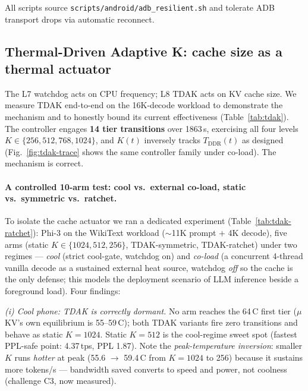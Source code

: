 \documentclass[sigconf, anonymous=false, screen=true]{acmart}
\begin{document}
All scripts source \texttt{scripts/android/adb\_resilient.sh} and tolerate ADB transport drops via automatic reconnect.




\subsection{Thermal-Driven Adaptive K: cache size as a thermal actuator}
\label{sec:eval-tdak}

The L7 watchdog acts on CPU frequency; L8 TDAK acts on KV cache size. We measure TDAK end-to-end on the 16K-decode workload to demonstrate the mechanism and to honestly bound its current effectiveness (Table~\ref{tab:tdak}). The controller engages \textbf{14 tier transitions} over 1863\,s, exercising all four levels $K\in\{256, 512, 768, 1024\}$, and $K(t)$ inversely tracks $T_{\text{DDR}}(t)$ as designed (Fig.~\ref{fig:tdak-trace} shows the same controller family under co-load). The mechanism is correct.

\paragraph{A controlled 10-arm test: cool vs.\ external co-load, static vs.\ symmetric vs.\ ratchet.} To isolate the cache actuator we ran a dedicated experiment (Table~\ref{tab:tdak-ratchet}): Phi-3 on the WikiText workload ($\sim$11K prompt $+$ 4K decode), five arms (static $K\in\{1024,512,256\}$, TDAK-symmetric, TDAK-ratchet) under two regimes --- \emph{cool} (strict cool-gate, watchdog on) and \emph{co-load} (a concurrent 4-thread vanilla decode as a sustained external heat source, watchdog \emph{off} so the cache is the only defense; this models the deployment scenario of LLM inference beside a foreground load). Four findings:

\emph{(i) Cool phone: TDAK is correctly dormant.} No arm reaches the 64\,\textdegree C first tier ($\mu$KV's own equilibrium is 55--59\,\textdegree C); both TDAK variants fire zero transitions and behave as static $K{=}1024$. Static $K{=}512$ is the cool-regime sweet spot (fastest PPL-safe point: 4.37\,tps, PPL 1.87). Note the \emph{peak-temperature inversion}: smaller $K$ runs \emph{hotter} at peak (55.6 $\to$ 59.4\,\textdegree C from $K{=}1024$ to 256) because it sustains more tokens/s --- bandwidth saved converts to speed and power, not coolness (challenge C3, now measured).
\end{document}
